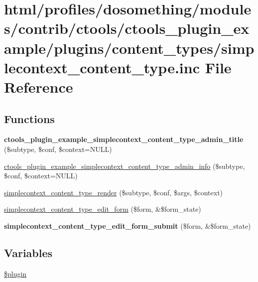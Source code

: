 \hypertarget{simplecontext__content__type_8inc}{
\section{html/profiles/dosomething/modules/contrib/ctools/ctools\_\-plugin\_\-example/plugins/content\_\-types/simplecontext\_\-content\_\-type.inc File Reference}
\label{simplecontext__content__type_8inc}
}
\subsection*{Functions}
\begin{DoxyCompactItemize}
\item 
\hypertarget{simplecontext__content__type_8inc_a89499d98ad9b2c5dc2e827a83551d33f}{
{\bfseries ctools\_\-plugin\_\-example\_\-simplecontext\_\-content\_\-type\_\-admin\_\-title} (\$subtype, \$conf, \$context=NULL)}
\label{simplecontext__content__type_8inc_a89499d98ad9b2c5dc2e827a83551d33f}

\item 
\hyperlink{simplecontext__content__type_8inc_a5c85e5b51f147db14ef542701b200e73}{ctools\_\-plugin\_\-example\_\-simplecontext\_\-content\_\-type\_\-admin\_\-info} (\$subtype, \$conf, \$context=NULL)
\item 
\hyperlink{simplecontext__content__type_8inc_a03ef3985a9df1ae74dab1e918d48199b}{simplecontext\_\-content\_\-type\_\-render} (\$subtype, \$conf, \$args, \$context)
\item 
\hyperlink{simplecontext__content__type_8inc_a036c8d9da11c23c4e11a6cfc3d5d08bd}{simplecontext\_\-content\_\-type\_\-edit\_\-form} (\$form, \&\$form\_\-state)
\item 
\hypertarget{simplecontext__content__type_8inc_addaa0cb869baa92c2838849069ddccd8}{
{\bfseries simplecontext\_\-content\_\-type\_\-edit\_\-form\_\-submit} (\$form, \&\$form\_\-state)}
\label{simplecontext__content__type_8inc_addaa0cb869baa92c2838849069ddccd8}

\end{DoxyCompactItemize}
\subsection*{Variables}
\begin{DoxyCompactItemize}
\item 
\hyperlink{simplecontext__content__type_8inc_ada8a7130088351710bb02ed622d6bf65}{\$plugin}
\end{DoxyCompactItemize}



